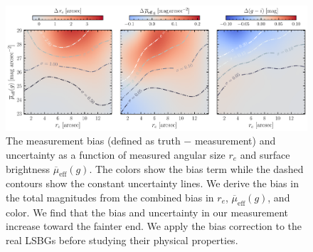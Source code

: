 \documentclass[twocolumn,astrosymb,twocolappendix]{aastex631}
\newcommand{\sbeff}{\overline{\mu}_{\mathrm{eff}}(g)}
\begin{document}
\begin{CJK*}{UTF8}{gbsn}
\begin{figure}
	\vbox{ 
		\centering
		\includegraphics[width=1\linewidth]{meas_error_spergel.pdf}
	}
    \caption{The measurement bias (defined as truth $-$ measurement) and uncertainty as a function of measured angular size $r_e$ and surface brightness $\sbeff$. The colors show the bias term while the dashed contours show the constant uncertainty lines. We derive the bias in the total magnitudes from the combined bias in $r_e$, $\sbeff$, and color. We find that the bias and uncertainty in our measurement increase toward the fainter end. We apply the bias correction to the real LSBGs before studying their physical properties.}
    \label{fig:meas_err}
\end{figure}

\vspace{1em}


\end{CJK*}
\end{document}
